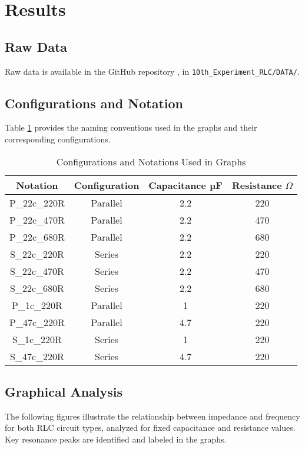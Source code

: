 \documentclass[journal]{IEEEtran}
\begin{document}
\section{Results}

\subsection{Raw Data}
Raw data is available in the GitHub repository \cite{github}, in \verb|10th_Experiment_RLC/DATA/|.

\subsection{Configurations and Notation}
Table \ref{tab:configurations} provides the naming conventions used in the graphs and their corresponding configurations.

\begin{table}[H]
    \centering
    \caption{Configurations and Notations Used in Graphs}
    \label{tab:configurations}
    \begin{tabular}{cccc}
    \toprule
    \textbf{Notation} & \textbf{Configuration} & \textbf{Capacitance µF} &  \textbf{Resistance $\Omega$} \\
    \midrule
    P\_22c\_220R  & Parallel & 2.2 &220\\
    P\_22c\_470R  & Parallel & 2.2 &470\\
    P\_22c\_680R  & Parallel & 2.2 &680\\
    S\_22c\_220R  & Series & 2.2 &220\\
    S\_22c\_470R  & Series & 2.2 &470\\
    S\_22c\_680R  & Series & 2.2 &680\\
    P\_1c\_220R   & Parallel & 1 &220\\
    P\_47c\_220R  & Parallel & 4.7 &220\\
    S\_1c\_220R   & Series & 1 &220\\
    S\_47c\_220R  & Series & 4.7 &220\\
    \bottomrule
    \end{tabular}
\end{table}
\subsection{Graphical Analysis}
The following figures illustrate the relationship between impedance and frequency for both RLC circuit types, analyzed for fixed capacitance and resistance values. Key resonance peaks are identified and labeled in the graphs.
\end{document}
